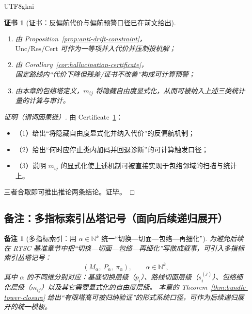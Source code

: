 \documentclass[12pt]{article}
\newtheorem{remark}{备注}[section]
\newtheorem{certificate}{证书}[section]
\newcommand{\RTSC}{\textsf{RTSC}}
\begin{document}
\begin{CJK*}{UTF8}{gkai}
\begin{certificate}[证书：反偏航代价与偏航预警口径已在前文给出]
\label{cert:envelope-anti-drift}
\begin{enumerate}
  \item 由 Proposition~\ref{prop:anti-drift-constraint}，\\
  $\mathrm{Unc}/\mathrm{Res}/\mathrm{Cert}$ 可作为一等项并入代价并压制投机解；
  \item 由 Corollary~\ref{cor:hallucination-certificate}，\\
  固定路线内“代价下降但残差/证书不改善”构成可计算预警；
  \item 由本章的包络塔定义，$m_{ij}$ 将隐藏自由度显式化，从而可被纳入上述三类统计量的计算与审计。
\end{enumerate}
\end{certificate}

\begin{proof}[证明（谓词因果链）]
由 Certificate~\ref{cert:envelope-anti-drift}：
\begin{itemize}
  \item（1）给出“将隐藏自由度显式化并纳入代价”的反偏航机制；
  \item（2）给出“何时应停止类内加码并回退诊断”的可计算触发口径；
  \item（3）说明 $m_{ij}$ 的显式化使上述机制可被直接实现于包络邻域的扫描与统计上。
\end{itemize}
三者合取即可推出推论两条结论。证毕。
\end{proof}

\subsection{备注：多指标索引丛塔记号（面向后续递归展开）}

\begin{remark}[多指标索引：用 $\alpha\in\mathbb{N}^k$ 统一“切换—切面—包络—再细化”]
为避免后续在 \RTSC{} 基准章节中把“切换—切面—包络—再细化”写散成叙事，可引入多指标索引丛塔记号：
\[
(M_\alpha,\ P_\alpha,\ \pi_\alpha),\qquad \alpha\in \mathbb{N}^k,
\]
其中 $\alpha$ 的不同维分别对应：基底切换层级（$p_i$）、路线切面层级（$s_i^{(j)}$）、包络细化层级（$m_{ij}$）以及其它需要显式化的自由度层级。
本章的 Theorem~\ref{thm:bundle-tower-closure} 给出“有限塔高可被归纳验证”的形式系统口径，可作为后续递归展开的统一模板。
\end{remark}

\clearpage


\end{CJK*}
\end{document}
